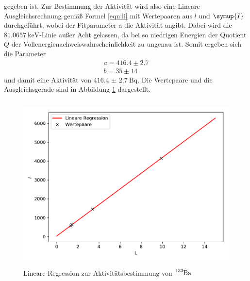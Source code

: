 gegeben ist. Zur Bestimmung der Aktivität wird also eine Lineare Ausgleichsrechnung
gemäß Formel \ref{eqn:li} mit Wertepaaren aus $l$ und $\symup{I}$ durchgeführt,
wobei der Fitparameter a die Aktivität angibt. Dabei wird die $\SI{81.0657}{\kilo\electronvolt}$-Linie
außer Acht gelassen, da bei so niedrigen Energien der Quotient $Q$ der Vollenergienachweiswahrscheinlichkeit
zu ungenau ist. Somit ergeben sich die Parameter
\begin{align*}
  a = 416.4 \pm 2.7 \\
  b = 35 \pm 14
\end{align*}
und damit eine Aktivität von $\SI{416.4(27)}{\becquerel} $.
Die Wertepaare und die Ausgleichsgerade sind in Abbildung \ref{fig:plot9} dargestellt.
\begin{figure}
  \centering
  \includegraphics[height=9cm]{Plot9.pdf}
  \caption{Lineare Regression zur Aktivitätsbestimmung von $\ce{^{133}Ba}$}
  \label{fig:plot9}
\end{figure}



